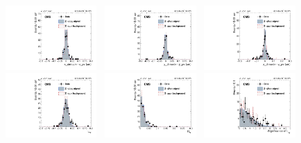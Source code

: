 		\begin{figure}[p]
		  \centering
		  \includegraphics[width=0.31\textwidth]{Fig/Final_NoPreliminary/ZJpsiG/VtxDispX_Norm_EBLR9}~
		  \includegraphics[width=0.31\textwidth]{Fig/Final_NoPreliminary/ZJpsiG/VtxDispY_Norm_EBLR9}~
		  \includegraphics[width=0.31\textwidth]{Fig/Final_NoPreliminary/ZJpsiG/VtxDispZ_Norm_EBLR9}\\
		  \includegraphics[width=0.31\textwidth]{Fig/Final_NoPreliminary/ZJpsiG/Lxy_Norm_EBLR9}~
		  \includegraphics[width=0.31\textwidth]{Fig/Final_NoPreliminary/ZJpsiG/Rxy_Norm_EBLR9}~
		  \includegraphics[width=0.31\textwidth]{Fig/Final_NoPreliminary/ZJpsiG/SLxy_Norm_EBLR9}\\

\end{figure}
